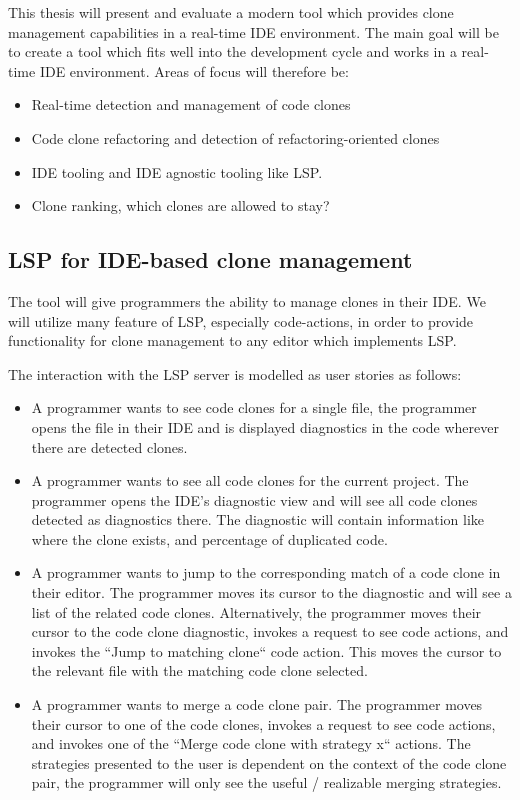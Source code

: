 \documentclass[12pt]{article}
\begin{document}
This thesis will present and evaluate a modern tool which provides clone management
capabilities in a real-time IDE environment. The main goal will be to create a tool which
fits well into the development cycle and works in a real-time IDE environment. Areas of
focus will therefore be:

\begin{itemize}
	\item Real-time detection and management of code clones
	\item Code clone refactoring and detection of refactoring-oriented clones
	\item IDE tooling and IDE agnostic tooling like LSP.
	\item Clone ranking, which clones are allowed to stay?
\end{itemize}

\subsection{LSP for IDE-based clone management}

The tool will give programmers the ability to manage clones in their IDE. We will utilize
many feature of LSP, especially code-actions, in order to provide functionality for clone
management to any editor which implements LSP.

The interaction with the LSP server is modelled as user stories as follows:

\begin{itemize}
	\item A programmer wants to see code clones for a single file, the
	      programmer opens the file in their IDE and is displayed diagnostics in the code
	      wherever there are detected clones.

	\item A programmer wants to see all code clones for the current project. The
	      programmer opens the IDE's diagnostic view and will see all code clones detected
	      as diagnostics there. The diagnostic will contain information like where the clone
	      exists, and percentage of duplicated code.

    \item A programmer wants to jump to the corresponding match of a code clone in their
        editor. The programmer moves its cursor to the diagnostic and will see a list of
        the related code clones. Alternatively, the programmer moves their cursor to the
        code clone diagnostic, invokes a request to see code actions, and invokes the
        ``Jump to matching clone`` code action. This moves the cursor to the relevant file
        with the matching code clone selected. 

	\item A programmer wants to merge a code clone pair. The programmer moves their cursor
	      to one of the code clones, invokes a request to see code actions, and invokes one
	      of the ``Merge code clone with strategy x`` actions. The strategies presented to
	      the user is dependent on the context of the code clone pair, the programmer will
	      only see the useful / realizable merging strategies.
\end{itemize}
\end{document}
